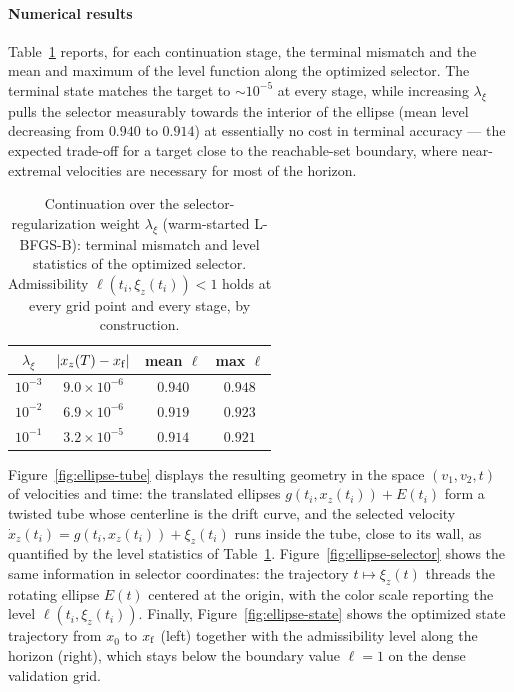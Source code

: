\documentclass[11pt]{elsarticle}
\theoremstyle{definition}
\theoremstyle{remark}
\numberwithin{equation}{section}
\begin{document}
\paragraph{Numerical results}
Table~\ref{tab:ellipse-continuation} reports, for each continuation
stage, the terminal mismatch and the mean and maximum of the level
function along the optimized selector. The terminal state matches the
target to $\sim10^{-5}$ at every stage, while increasing
$\lambda_{\xi}$ pulls the selector measurably towards the interior of
the ellipse (mean level decreasing from $0.940$ to $0.914$) at
essentially no cost in terminal accuracy --- the expected trade-off for
a target close to the reachable-set boundary, where near-extremal
velocities are necessary for most of the horizon.

\begin{table}[htbp]
	\centering
	\begin{tabular}{cccc}
		\toprule
		$\lambda_{\xi}$ & $|x_z(T)-x_{\rm f}|$ & mean $\ell$ & max $\ell$ \\
		\midrule
		$10^{-3}$ & $9.0\times10^{-6}$ & $0.940$ & $0.948$ \\
		$10^{-2}$ & $6.9\times10^{-6}$ & $0.919$ & $0.923$ \\
		$10^{-1}$ & $3.2\times10^{-5}$ & $0.914$ & $0.921$ \\
		\bottomrule
	\end{tabular}
	\caption{Continuation over the selector-regularization weight
		$\lambda_{\xi}$ (warm-started L-BFGS-B): terminal mismatch and level
		statistics of the optimized selector. Admissibility
		$\ell(t_i,\xi_z(t_i))<1$ holds at every grid point and every stage, by
		construction.}
	\label{tab:ellipse-continuation}
\end{table}

Figure~\ref{fig:ellipse-tube} displays the resulting geometry in the
space $(v_1,v_2,t)$ of velocities and time: the translated ellipses
$g(t_i,x_z(t_i))+E(t_i)$ form a twisted tube whose centerline is the
drift curve, and the selected velocity
$\dot{x}_z(t_i)=g(t_i,x_z(t_i))+\xi_z(t_i)$ runs inside the tube, close
to its wall, as quantified by the level statistics of
Table~\ref{tab:ellipse-continuation}. Figure~\ref{fig:ellipse-selector}
shows the same information in selector coordinates: the trajectory
$t\mapsto\xi_z(t)$ threads the rotating ellipse $E(t)$ centered at the
origin, with the color scale reporting the level
$\ell(t_i,\xi_z(t_i))$. Finally, Figure~\ref{fig:ellipse-state} shows
the optimized state trajectory from $x_0$ to $x_{\rm f}$ (left) together
with the admissibility level along the horizon (right), which stays
below the boundary value $\ell=1$ on the dense validation grid.
\end{document}
